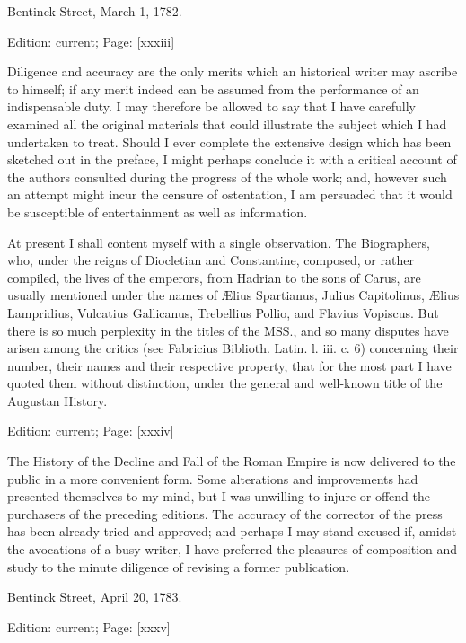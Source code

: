 Bentinck Street, March 1, 1782.

Edition: current; Page: [xxxiii]


Diligence and accuracy are the only merits which an historical writer may ascribe to himself; if any merit indeed can be assumed from the performance of an indispensable duty. I may therefore be allowed to say that I have carefully examined all the original materials that could illustrate the subject which I had undertaken to treat. Should I ever complete the extensive design which has been sketched out in the preface, I might perhaps conclude it with a critical account of the authors consulted during the progress of the whole work; and, however such an attempt might incur the censure of ostentation, I am persuaded that it would be susceptible of entertainment as well as information.

At present I shall content myself with a single observation. The Biographers, who, under the reigns of Diocletian and Constantine, composed, or rather compiled, the lives of the emperors, from Hadrian to the sons of Carus, are usually mentioned under the names of Ælius Spartianus, Julius Capitolinus, Ælius Lampridius, Vulcatius Gallicanus, Trebellius Pollio, and Flavius Vopiscus. But there is so much perplexity in the titles of the MSS., and so many disputes have arisen among the critics (see Fabricius Biblioth. Latin. l. iii. c. 6) concerning their number, their names and their respective property, that for the most part I have quoted them without distinction, under the general and well-known title of the Augustan History.

Edition: current; Page: [xxxiv]


The History of the Decline and Fall of the Roman Empire is now delivered to the public in a more convenient form. Some alterations and improvements had presented themselves to my mind, but I was unwilling to injure or offend the purchasers of the preceding editions. The accuracy of the corrector of the press has been already tried and approved; and perhaps I may stand excused if, amidst the avocations of a busy writer, I have preferred the pleasures of composition and study to the minute diligence of revising a former publication.

Bentinck Street, April 20, 1783.

Edition: current; Page: [xxxv]

